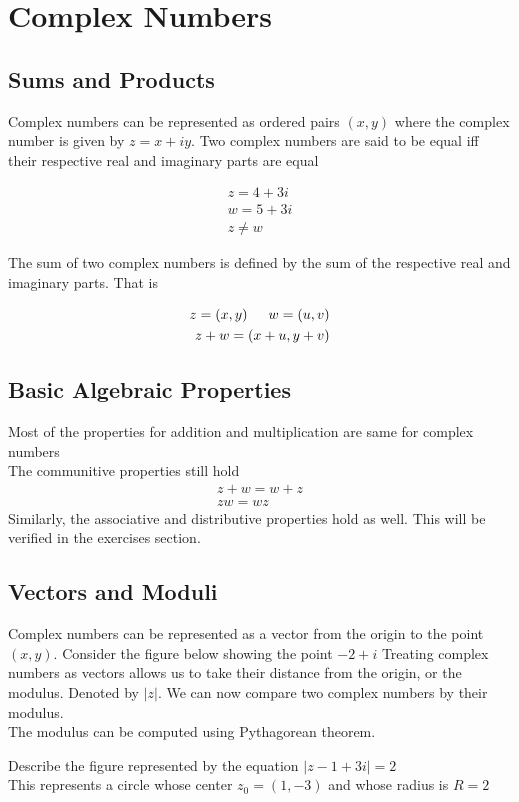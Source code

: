 \chapter{Complex Numbers}
\section{Sums and Products}
Complex numbers can be represented as ordered pairs $ (x,y) $ where the complex number is given by $ z = x + iy $. Two complex numbers are said to be equal iff their respective real and imaginary parts are equal 
\begin{example}
	\begin{align}
		z = 4 + 3i \\
		w = 5 + 3i \\
		z \neq w
	\end{align}
\end{example}
The sum of two complex numbers is defined by the sum of the respective real and imaginary parts. That is 
\begin{example}
	\begin{align}
		z = (x,y) \indent w = (u,v) \\
		z + w = (x+u, y+v)
	\end{align}
\end{example}
\section{Basic Algebraic Properties}
Most of the properties for addition and multiplication are same for complex numbers \\
The communitive properties still hold
\begin{align}
z +w = w+z \\ 
zw = wz
\end{align}
Similarly, the associative and distributive properties hold as well. This will be verified in the exercises section.   
\section{Vectors and Moduli}
Complex numbers can be represented as a vector from the origin to the point $ (x,y) $. Consider the figure below showing the point $ -2 + i $
Treating complex numbers as vectors allows us to take their distance from the origin, or the modulus. Denoted by $ |z| $. We can now compare two complex numbers by their modulus. \\
The modulus can be computed using Pythagorean theorem.
\begin{example}
	Describe the figure represented by the equation $ |z -1 + 3i| = 2 $ \\ This represents a circle whose center $ z_0 = (1,-3) $ and whose radius is $ R =2 $
\end{example} 
